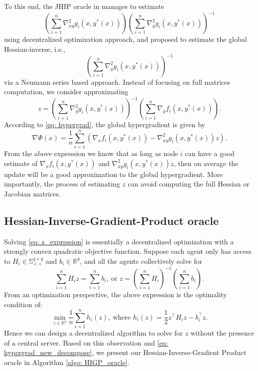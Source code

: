 \documentclass{article}
\theoremstyle{plain}
\theoremstyle{definition}
\theoremstyle{remark}
\newcommand{\R}{\mathbb{R}}
\newcommand{\T}{^{\top}}
\newcommand{\bS}{\mathbb{S}}
\begin{document}
To this end, the JHIP oracle in \citet{chen2022decentralized} manages to estimate
\[
    \left(\sum_{i=1}^{n}\nabla_{xy}^2 g_i(x,y^*(x))\right) \left(\sum_{i=1}^{n}\nabla_y^2g_i(x,y^*(x))\right)^{-1}
\]
using decentralized optimization approach, and \citet{yang2022decentralized} proposed to estimate the global Hessian-inverse, i.e., 
\[
    \left(\sum_{i=1}^{n}\nabla_y^2g_i(x,y^*(x))\right)^{-1}
\]
via a Neumann series based approach. Instead of focusing on full matrices computation, we consider approximating
\begin{equation}\label{eq: z_expression}
    z = \left(\sum_{i=1}^{n}\nabla_y^2g_i(x,y^*(x))\right)^{-1}\left(\sum_{i=1}^{n}\nabla_yf_i(x,y^*(x))\right).
\end{equation}
According to \eqref{eq: hypergrad}, the global hypergradient is given by
\begin{equation}\label{eq: hypergrad_new_decompose}
    \nabla\Phi(x)=\frac{1}{n}\sum_{i=1}^{n}(\nabla_x f_i(x,y^*(x)) - \nabla_{xy}^2 g_i(x,y^*(x))z).
\end{equation}
From the above expression we know that as long as node $i$ can have a good estimate of $\nabla_x f_i(x,y^*(x))$ and $\nabla_{xy}^2g_i(x,y^*(x))z$, then on average the update will be a good approximation to the global hypergradient. More importantly, the process of estimating $z$ can avoid computing the full Hessian or Jacobian matrices.

\subsection{Hessian-Inverse-Gradient-Product oracle}\label{sec: HIGP_oracle}

Solving \eqref{eq: z_expression} is essentially a decentralized optimization with a strongly convex quadratic objective function. Suppose each agent only has access to $H_i\in\bS_{++}^{q\times q}$ and $b_i\in\R^q$, and all the agents collectively solve for
\begin{equation}\label{eq: higp_eq}
    \sum_{i=1}^{n}H_iz = \sum_{i=1}^{n}b_i,\ \text{or } z = \left(\sum_{i=1}^{n}H_i\right)^{-1}\left(\sum_{i=1}^{n}b_i\right).
\end{equation}
From an optimization perspective, the above expression is the optimality condition of:
\begin{equation}\label{eq: higp_opt}
    \min_{z\in\mathbb{R}^{q}}\frac{1}{n}\sum_{i=1}^{n}h_i(z),\ \text{where  }h_i(z)=\frac{1}{2}z^{\top}H_iz - b_i\T z.
\end{equation}
Hence we can design a decentralized algorithm to solve for $z$ without the presence of a central server. Based on this observation and \eqref{eq: hypergrad_new_decompose}, we present our Hessian-Inverse-Gradient Product oracle in Algorithm \ref{algo: HIGP_oracle}.
\end{document}
